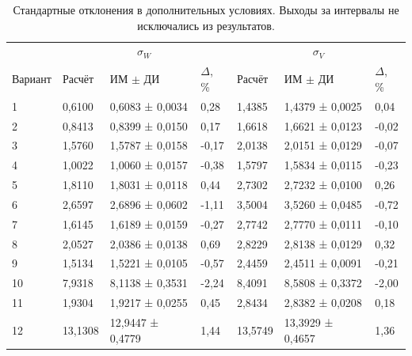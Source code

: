 \documentclass[a4paper,12pt]{article}
\begin{document}
\begin{table}[!htbp]
\centering\small\setlength{\tabcolsep}{2pt}
\begin{tabular}{@{}p{4.16cm}p{1.61cm}p{2.83cm}p{1.28cm}p{1.61cm}p{2.83cm}p{1.28cm}@{}}
\toprule
 & \multicolumn{3}{c}{$\sigma_W$} & \multicolumn{3}{c}{$\sigma_V$} \\
Вариант & Расчёт & ИМ $\pm$ ДИ & $\Delta$, \% & Расчёт & ИМ $\pm$ ДИ & $\Delta$, \% \\
\midrule
1 & 0,6100 & 0,6083 ± 0,0034 & 0,28 & 1,4385 & 1,4379 ± 0,0025 & 0,04 \\
2 & 0,8413 & 0,8399 ± 0,0150 & 0,17 & 1,6618 & 1,6621 ± 0,0123 & -0,02 \\
3 & 1,5760 & 1,5787 ± 0,0158 & -0,17 & 2,0138 & 2,0151 ± 0,0129 & -0,07 \\
4 & 1,0022 & 1,0060 ± 0,0157 & -0,38 & 1,5797 & 1,5834 ± 0,0115 & -0,23 \\
5 & 1,8110 & 1,8031 ± 0,0118 & 0,44 & 2,7302 & 2,7232 ± 0,0100 & 0,26 \\
6 & 2,6597 & 2,6896 ± 0,0602 & -1,11 & 3,5004 & 3,5260 ± 0,0485 & -0,72 \\
7 & 1,6145 & 1,6189 ± 0,0159 & -0,27 & 2,7742 & 2,7770 ± 0,0111 & -0,10 \\
8 & 2,0527 & 2,0386 ± 0,0138 & 0,69 & 2,8229 & 2,8138 ± 0,0129 & 0,32 \\
9 & 1,5134 & 1,5221 ± 0,0105 & -0,57 & 2,4459 & 2,4511 ± 0,0091 & -0,21 \\
10 & 7,9318 & 8,1138 ± 0,3531 & -2,24 & 8,4091 & 8,5808 ± 0,3372 & -2,00 \\
11 & 1,9304 & 1,9217 ± 0,0255 & 0,45 & 2,8434 & 2,8382 ± 0,0208 & 0,18 \\
12 & 13,1308 & 12,9447 ± 0,4779 & 1,44 & 13,5749 & 13,3929 ± 0,4657 & 1,36 \\
\bottomrule
\end{tabular}
\caption{Стандартные отклонения в дополнительных условиях. Выходы за интервалы не исключались из результатов.}
\label{tab:studystd}
\end{table}
\end{document}
